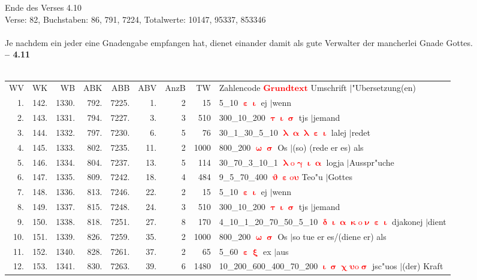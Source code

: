 \documentclass[a4paper,10pt,landscape]{article}
\begin{document}
Ende des Verses 4.10\\
Verse: 82, Buchstaben: 86, 791, 7224, Totalwerte: 10147, 95337, 853346\\
\\
Je nachdem ein jeder eine Gnadengabe empfangen hat, dienet einander damit als gute Verwalter der mancherlei Gnade Gottes.\\
\newpage 
{\bf -- 4.11}\\
\medskip \\
\begin{tabular}{rrrrrrrrp{120mm}}
WV&WK&WB&ABK&ABB&ABV&AnzB&TW&Zahlencode \textcolor{red}{$\boldsymbol{Grundtext}$} Umschrift $|$"Ubersetzung(en)\\
1.&142.&1330.&792.&7225.&1.&2&15&5\_10 \textcolor{red}{$\boldsymbol{\upepsilon\upiota}$} ej $|$wenn\\
2.&143.&1331.&794.&7227.&3.&3&510&300\_10\_200 \textcolor{red}{$\boldsymbol{\uptau\upiota\upsigma}$} tjs $|$jemand\\
3.&144.&1332.&797.&7230.&6.&5&76&30\_1\_30\_5\_10 \textcolor{red}{$\boldsymbol{\uplambda\upalpha\uplambda\upepsilon\upiota}$} lalej $|$redet\\
4.&145.&1333.&802.&7235.&11.&2&1000&800\_200 \textcolor{red}{$\boldsymbol{\upomega\upsigma}$} Os $|$(so) (rede er es) als\\
5.&146.&1334.&804.&7237.&13.&5&114&30\_70\_3\_10\_1 \textcolor{red}{$\boldsymbol{\uplambda\mathrm{o}\upgamma\upiota\upalpha}$} logja $|$Ausspr"uche\\
6.&147.&1335.&809.&7242.&18.&4&484&9\_5\_70\_400 \textcolor{red}{$\boldsymbol{\upvartheta\upepsilon\mathrm{o}\upsilon}$} Teo"u $|$Gottes\\
7.&148.&1336.&813.&7246.&22.&2&15&5\_10 \textcolor{red}{$\boldsymbol{\upepsilon\upiota}$} ej $|$wenn\\
8.&149.&1337.&815.&7248.&24.&3&510&300\_10\_200 \textcolor{red}{$\boldsymbol{\uptau\upiota\upsigma}$} tjs $|$jemand\\
9.&150.&1338.&818.&7251.&27.&8&170&4\_10\_1\_20\_70\_50\_5\_10 \textcolor{red}{$\boldsymbol{\updelta\upiota\upalpha\upkappa\mathrm{o}\upnu\upepsilon\upiota}$} djakonej $|$dient\\
10.&151.&1339.&826.&7259.&35.&2&1000&800\_200 \textcolor{red}{$\boldsymbol{\upomega\upsigma}$} Os $|$so tue er es/(diene er) als\\
11.&152.&1340.&828.&7261.&37.&2&65&5\_60 \textcolor{red}{$\boldsymbol{\upepsilon\upxi}$} ex $|$aus\\
12.&153.&1341.&830.&7263.&39.&6&1480&10\_200\_600\_400\_70\_200 \textcolor{red}{$\boldsymbol{\upiota\upsigma\upchi\upsilon\mathrm{o}\upsigma}$} jsc"uos $|$(der) Kraft\\

\end{tabular}
\end{document}

